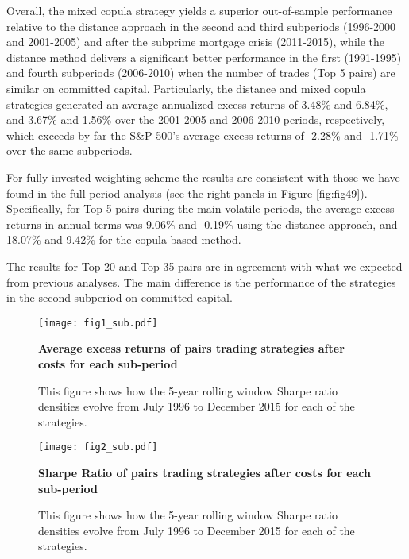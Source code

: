\documentclass[a4paper]{article}
\begin{document}
Overall, the mixed copula strategy yields a superior out-of-sample performance relative to the distance approach in the second and third subperiods (1996-2000 and 2001-2005) and after the subprime mortgage crisis (2011-2015), while the distance method delivers a significant better performance in the first (1991-1995) and fourth subperiods (2006-2010) when the number of trades (Top 5 pairs) are similar on committed capital. Particularly, the distance and mixed copula strategies generated an average annualized excess returns of 3.48\% and 6.84\%, and 3.67\% and 1.56\% over the 2001-2005 and 2006-2010 periods, respectively, which exceeds by far the S\&P 500's average excess returns of -2.28\% and -1.71\% over the same subperiods.

For fully invested weighting scheme the results are consistent with those we have found in the full period analysis (see the right panels in Figure \ref{fig:fig49}). Specifically, for Top 5 pairs during the main volatile periods, the average excess returns in annual terms was 9.06\% and -0.19\% using the distance approach, and 18.07\% and 9.42\% for the copula-based method.

The results for Top 20 and Top 35 pairs are in agreement with what we expected from previous analyses. The main difference is the performance of the strategies in the second subperiod on committed capital.

\begin{figure}[H]
	\centering
		\texttt{[image: fig1\_sub.pdf]}
	\captionsetup{justification=raggedright,
		singlelinecheck=false
	}
	\caption{\textbf{Average excess returns of pairs trading strategies after costs for each sub-period}}
	\caption*{\scriptsize This figure shows how the 5-year rolling window Sharpe ratio densities evolve from July 1996 to December 2015 for each of the strategies.}
	\label{fig:fig6}
\end{figure}

\begin{figure}[H]
	\centering
		\texttt{[image: fig2\_sub.pdf]}
	\captionsetup{justification=raggedright,
		singlelinecheck=false
	}
	\caption{\textbf{Sharpe Ratio of pairs trading strategies after costs for each sub-period}}
	\caption*{\scriptsize This figure shows how the 5-year rolling window Sharpe ratio densities evolve from July 1996 to December 2015 for each of the strategies.}
	\label{fig:fig7}
\end{figure}

\vspace{1.0cm}
\end{document}
